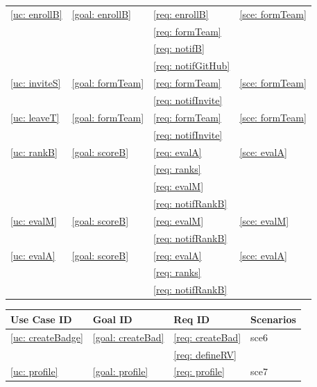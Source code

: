 \begin{table}[h]
\begin{tabular}{|m{3cm}|m{3cm}|m{3cm}|m{3cm}|}
                \hline
                \ref{uc: enrollB} & \ref{goal: enrollB} & \ref{req: enrollB} & \ref{sce: formTeam} \\
                \null & \null  & \ref{req: formTeam}& \null \\ 
                \null & \null  & \ref{req: notifB}&\null \\
                \null & \null  & \ref{req: notifGitHub}&\null \\
                \hline
                \ref{uc: inviteS} & \ref{goal: formTeam} & \ref{req: formTeam} & \ref{sce: formTeam} \\
                \null & \null  & \ref{req: notifInvite}& \null \\ 
                \hline
                \ref{uc: leaveT} & \ref{goal: formTeam} & \ref{req: formTeam} & \ref{sce: formTeam} \\
                \null & \null  & \ref{req: notifInvite}& \null \\ 
                \hline
                \ref{uc: rankB} & \ref{goal: scoreB} & \ref{req: evalA} & \ref{sce: evalA} \\
                \null & \null  & \ref{req: ranks}& \null \\ 
                \null & \null  & \ref{req: evalM}&\null \\
                \null & \null  & \ref{req: notifRankB}&\null \\
                \hline
                \ref{uc: evalM} & \ref{goal: scoreB} & \ref{req: evalM} & \ref{sce: evalM} \\
                \null & \null  & \ref{req: notifRankB}&\null \\
                \hline
                \ref{uc: evalA} & \ref{goal: scoreB} & \ref{req: evalA} & \ref{sce: evalA} \\
                \null & \null  & \ref{req: ranks}&\null \\
                \null & \null  & \ref{req: notifRankB}&\null \\
                \hline

            \end{tabular}
    \end{table}

    \clearpage
    \begin{table}[h]
        \centering
        \renewcommand{\arraystretch}{1.5}
        \begin{tabular}{|m{3cm}|m{3cm}|m{3cm}|m{3cm}|}
            \hline
            \textbf{Use Case ID} & \textbf{Goal ID} & \textbf{Req ID} & \textbf{Scenarios} \\
            \hline
            \ref{uc: createBadge} & \ref{goal: createBad} & \ref{req: createBad} & sce6 \\
            \null & \null  & \ref{req: defineRV}&\null \\
            \hline
            \ref{uc: profile} & \ref{goal: profile} & \ref{req: profile} & sce7 \\
            \hline
        \end{tabular}
    \end{table}
    
